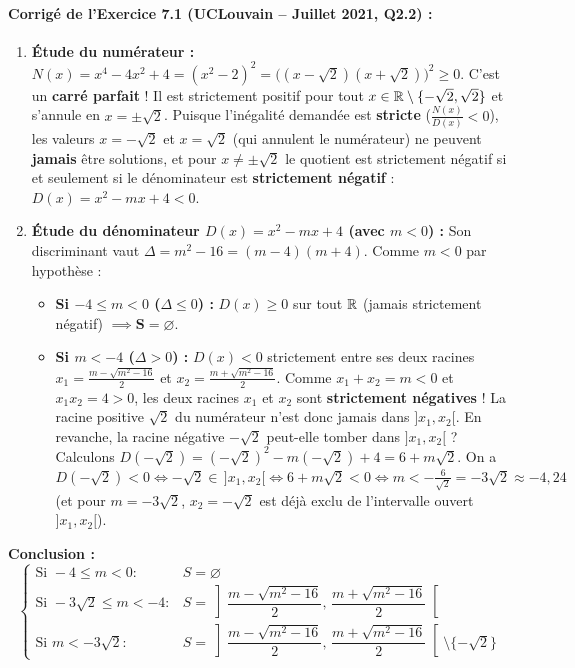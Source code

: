 \paragraph{Corrigé de l'Exercice 7.1 (UCLouvain -- Juillet 2021, Q2.2) :}
\begin{enumerate}
    \item \textbf{Étude du numérateur :} $N(x) = x^4 - 4x^2 + 4 = (x^2 - 2)^2 = \bigl((x - \sqrt{2})(x + \sqrt{2})\bigr)^2 \ge 0$.
    C'est un \textbf{carré parfait} ! Il est strictement positif pour tout $x \in \mathbb{R} \setminus \{-\sqrt{2}, \sqrt{2}\}$ et s'annule en $x = \pm\sqrt{2}$.
    Puisque l'inégalité demandée est \textbf{stricte} ($\frac{N(x)}{D(x)} < 0$), les valeurs $x = -\sqrt{2}$ et $x = \sqrt{2}$ (qui annulent le numérateur) ne peuvent \textbf{jamais} être solutions, et pour $x \neq \pm\sqrt{2}$ le quotient est strictement négatif si et seulement si le dénominateur est \textbf{strictement négatif} : $D(x) = x^2 - mx + 4 < 0$.
    \item \textbf{Étude du dénominateur $D(x) = x^2 - mx + 4$ (avec $m < 0$) :}
    Son discriminant vaut $\Delta = m^2 - 16 = (m - 4)(m + 4)$. Comme $m < 0$ par hypothèse :
    \begin{itemize}
        \item \textbf{Si $-4 \le m < 0$ ($\Delta \le 0$) :} $D(x) \ge 0$ sur tout $\mathbb{R}$ (jamais strictement négatif) $\implies \mathbf{S = \varnothing}$.
        \item \textbf{Si $m < -4$ ($\Delta > 0$) :} $D(x) < 0$ strictement entre ses deux racines $x_1 = \frac{m - \sqrt{m^2 - 16}}{2}$ et $x_2 = \frac{m + \sqrt{m^2 - 16}}{2}$.
        Comme $x_1 + x_2 = m < 0$ et $x_1 x_2 = 4 > 0$, les deux racines $x_1$ et $x_2$ sont \textbf{strictement négatives} ! La racine positive $\sqrt{2}$ du numérateur n'est donc jamais dans $]x_1, x_2[$. En revanche, la racine négative $-\sqrt{2}$ peut-elle tomber dans $]x_1, x_2[$ ?
        Calculons $D(-\sqrt{2}) = (-\sqrt{2})^2 - m(-\sqrt{2}) + 4 = 6 + m\sqrt{2}$.
        On a $D(-\sqrt{2}) < 0 \iff -\sqrt{2} \in \,]x_1, x_2[ \iff 6 + m\sqrt{2} < 0 \iff m < -\frac{6}{\sqrt{2}} = -3\sqrt{2} \approx -4,24$ (et pour $m = -3\sqrt{2}$, $x_2 = -\sqrt{2}$ est déjà exclu de l'intervalle ouvert $]x_1, x_2[$).
    \end{itemize}
\end{enumerate}
\textbf{Conclusion :}
\[
    \boxed{\begin{cases}
        \text{Si } -4 \le m < 0 : & S = \varnothing \\
        \text{Si } -3\sqrt{2} \le m < -4 : & S = \left]\dfrac{m - \sqrt{m^2 - 16}}{2},\, \dfrac{m + \sqrt{m^2 - 16}}{2}\right[ \\[2ex]
        \text{Si } m < -3\sqrt{2} : & S = \left]\dfrac{m - \sqrt{m^2 - 16}}{2},\, \dfrac{m + \sqrt{m^2 - 16}}{2}\right[ \setminus \{-\sqrt{2}\}
    \end{cases}}
\]

